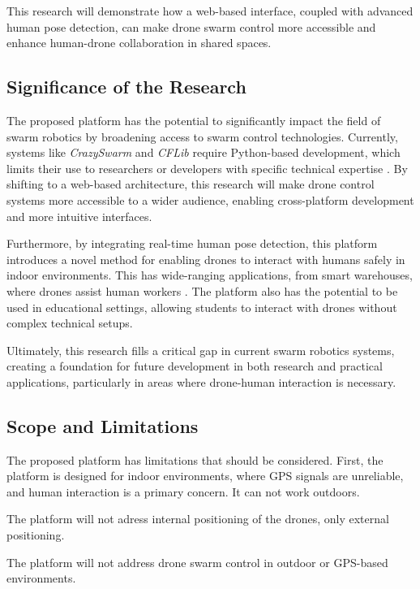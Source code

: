 This research will demonstrate how a web-based interface, coupled with advanced human pose detection, can make drone swarm control more accessible and enhance human-drone collaboration in shared spaces.

\subsection{Significance of the Research}

The proposed platform has the potential to significantly impact the field of swarm robotics by broadening access to swarm control technologies. Currently, systems like \textit{CrazySwarm} and \textit{CFLib} require Python-based development, which limits their use to researchers or developers with specific technical expertise \cite{crazyflie,bitcraze_cflib}. By shifting to a web-based architecture, this research will make drone control systems more accessible to a wider audience, enabling cross-platform development and more intuitive interfaces.

Furthermore, by integrating real-time human pose detection, this platform introduces a novel method for enabling drones to interact with humans safely in indoor environments. This has wide-ranging applications, from smart warehouses, where drones assist human workers \cite{flyjacket, human_drone_interaction}. The platform also has the potential to be used in educational settings, allowing students to interact with drones without complex technical setups.

Ultimately, this research fills a critical gap in current swarm robotics systems, creating a foundation for future development in both research and practical applications, particularly in areas where drone-human interaction is necessary.

\subsection{Scope and Limitations}

The proposed platform has limitations that should be considered. First, the platform is designed for indoor environments, where GPS signals are unreliable, and human interaction is a primary concern. It can not work outdoors.

The platform will not adress internal positioning of the drones, only external positioning.

The platform will not address drone swarm control in outdoor or GPS-based environments.

